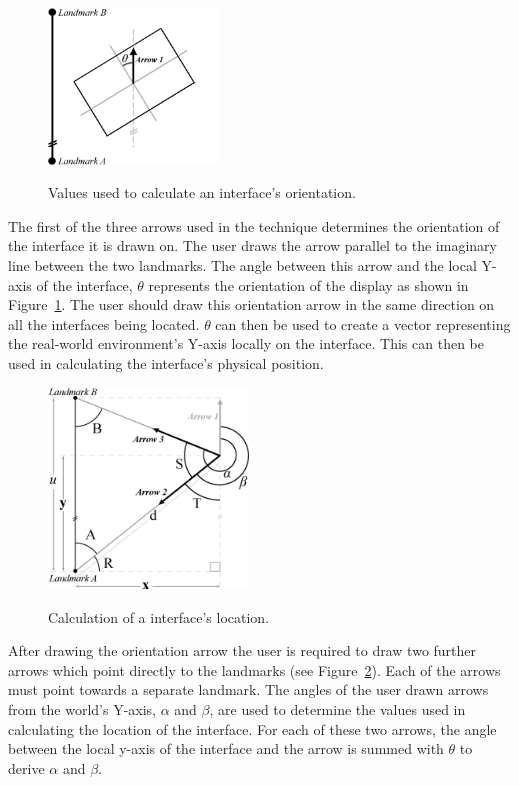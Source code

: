 \documentclass{bmcart}
\begin{document}
\begin{figure}[h]
   \centering
   \caption{Values used to calculate an interface's orientation.}
   \includegraphics[width=0.4\textwidth]{figures/orientation_maths.png}
   \label{fig:orienTrig}
\end{figure}

The first of the three arrows used in the technique determines the orientation of the interface it is drawn on.
The user draws the arrow parallel to the imaginary line between the two landmarks.
The angle between this arrow and the local Y-axis of the interface, $\theta$ represents the orientation of the display as shown in Figure~\ref{fig:orienTrig}.
The user should draw this orientation arrow in the same direction on all the interfaces being located.
\textbf{$\theta$} can then be used to create a vector representing the real-world environment's Y-axis locally on the interface.
This can then be used in calculating the interface's physical position.

\begin{figure}[h]
   \centering
   \caption{Calculation of a interface's location.}
   \includegraphics[width=0.475\textwidth]{figures/trig-illustration.png}
   \label{fig:trig}
\end{figure}

After drawing the orientation arrow the user is required to draw two further arrows which point directly to the landmarks (see Figure~\ref{fig:trig}).
Each of the arrows must point towards a separate landmark.
The angles of the user drawn arrows from the world's Y-axis, $\alpha$ and $\beta$, are used to determine the values used in calculating the location of the interface.
For each of these two arrows, the angle between the local y-axis of the interface and the arrow is summed with $\theta$ to derive $\alpha$ and $\beta$.
\end{document}
